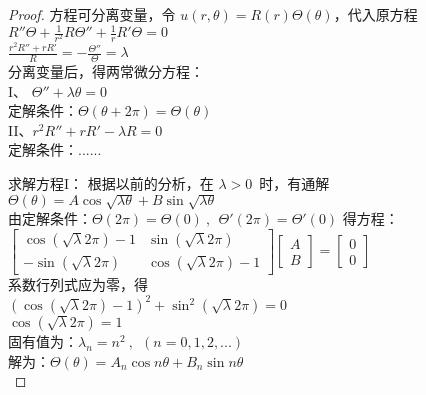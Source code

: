 \begin{proof} 
方程可分离变量，令 $\displaystyle  u(r,\theta)=R(r) \Theta(\theta)$，代入原方程  \\ 
{ $\displaystyle  R''\Theta +\frac{1}{r^2} R\Theta '' +\frac{1}{r}R'\Theta=0 $} \\ 
{ $\displaystyle  \frac{r^2R''+rR'}{R}=-\frac{\Theta '' }{\Theta} =\lambda $} \\ 
分离变量后，得两常微分方程：\\ 
{I、 $\displaystyle 	\Theta '' + \lambda \theta =0 $ } \\ 
{ 定解条件：$\displaystyle 	\Theta(\theta +2 \pi )=\Theta (\theta)  $ } \\ 
{II、$\displaystyle  r^2 R'' +r R' -\lambda R =0 $  } \\ 
{ 定解条件：......}


求解方程I：  根据以前的分析，在 $\lambda > 0 $ 时，有通解\\ 
{ $\displaystyle  \Theta(\theta)=A\cos \sqrt{\lambda \theta} +B\sin \sqrt{\lambda \theta}$}\\ 
由定解条件：$\displaystyle 	\Theta(2 \pi )=\Theta (0)~,~~ 	\Theta' (2 \pi )=\Theta' (0)  $ 得方程： \\ 
	$ \left [
\begin{array}{lll}
	\cos (\sqrt {\lambda} 2\pi )-1  & \sin (\sqrt {\lambda} 2\pi )\\
	-\sin (\sqrt {\lambda} 2\pi ) & \cos (\sqrt {\lambda} 2\pi )-1
\end{array} \right] 
\left [
\begin{array}{lll}
	A\\
	B
\end{array} \right] 
=
\left [
\begin{array}{lll}
	0\\
	0
\end{array} \right]
$ \\
系数行列式应为零，得\\
$(\cos (\sqrt {\lambda} 2\pi )-1 ) ^2 + \sin ^2 (\sqrt {\lambda} 2\pi ) =0$ \\ 
$\cos (\sqrt {\lambda} 2\pi)=1$   \\ 
固有值为：$\lambda _n =n^2 ~,~~ (n=0,1,2,...)$  \\ 
解为：$\displaystyle  \Theta(\theta)=A_n\cos n \theta +B_n \sin n \theta $\\ 


\end{proof}
